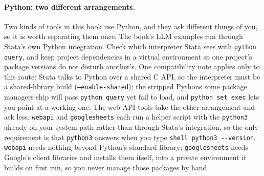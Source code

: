 \paragraph{Python: two different arrangements.} Two kinds of tools in this book use Python, and they ask different things of you, so it is worth separating them once. The book's LLM examples run through Stata's own Python integration. Check which interpreter Stata sees with \texttt{python query}, and keep project dependencies in a virtual environment so one project's package versions do not disturb another's. One compatibility note applies only to this route: Stata talks to Python over a shared C API, so the interpreter must be a shared-library build (\texttt{--enable-shared}); the stripped Pythons some package managers ship will pass \texttt{python query} yet fail to load, and \texttt{python set exec} lets you point at a working one. The web-API tools take the other arrangement and ask less. \texttt{webapi} and \texttt{googlesheets} each run a helper script with the \texttt{python3} already on your system path rather than through Stata's integration, so the only requirement is that \texttt{python3} answers when you type \texttt{shell python3 -{}-version}. \texttt{webapi} needs nothing beyond Python's standard library; \texttt{googlesheets} needs Google's client libraries and installs them itself, into a private environment it builds on first run, so you never manage those packages by hand.

